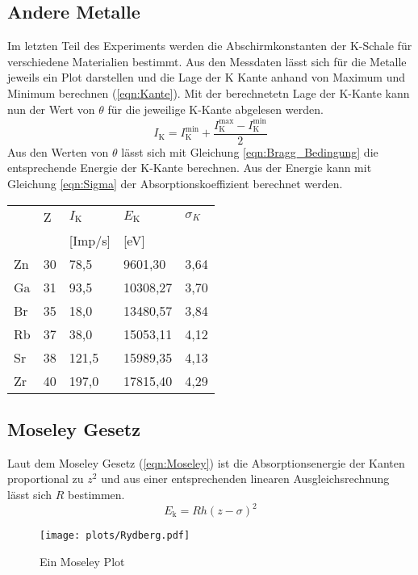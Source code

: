 \subsection{Andere Metalle}
Im letzten Teil des Experiments werden die Abschirmkonstanten der K-Schale für verschiedene Materialien bestimmt.
Aus den Messdaten lässt sich für die Metalle jeweils ein Plot darstellen und die Lage der K Kante anhand von Maximum und Minimum berechnen (\ref{eqn:Kante}).
Mit der berechnetetn Lage der K-Kante kann nun der Wert von $\theta$ für die jeweilige K-Kante abgelesen werden. 
\begin{equation}
    I_{\text{K}}= I_{\text{K}}^{\text{min}} + \frac{I_{\text{K}}^{\text{max}}-I_{\text{K}}^{\text{min}}}{2} \label{eqn:Kante}
\end{equation}
Aus den Werten von $\theta$ lässt sich mit Gleichung \ref{eqn:Bragg_Bedingung} die entsprechende Energie der K-Kante berechnen.
Aus der Energie kann mit Gleichung \ref{eqn:Sigma} der Absorptionskoeffizient berechnet werden.
\begin{table}[H]
\centering
\begin{tabular}{lllll}
  & Z & $I_{\text{K}}$ & $E_{\text{K}}$ & $\sigma_K$\\
  &   & [Imp/s]& [eV] &   \\
  \toprule
Zn & 30 & 78,5 & 9601,30 & 3,64 \\
\midrule
Ga & 31 & 93,5 & 10308,27 & 3,70 \\ 
\midrule
Br & 35 & 18,0 & 13480,57 & 3,84\\ 
\midrule
Rb & 37 & 38,0 & 15053,11 & 4,12 \\ 
\midrule
Sr & 38 & 121,5 & 15989,35 & 4,13 \\
\midrule
Zr & 40 & 197,0 & 17815,40 & 4,29 \\
\bottomrule
\end{tabular}
\end{table}

\subsection{Moseley Gesetz}
Laut dem Moseley Gesetz (\ref{eqn:Moseley}) ist die Absorptionsenergie der Kanten proportional zu $z^2$ und aus einer entsprechenden linearen Ausgleichsrechnung lässt sich $R$ bestimmen.
\begin{equation}
    E_{\text{k}}= Rh\left(z-\sigma\right)^2 \label{eqn:Moseley}
\end{equation}
\begin{figure}
    \centering
    \texttt{[image: plots/Rydberg.pdf]}
    \caption{Ein Moseley Plot}
    \label{fig:Moseley}
\end{figure}